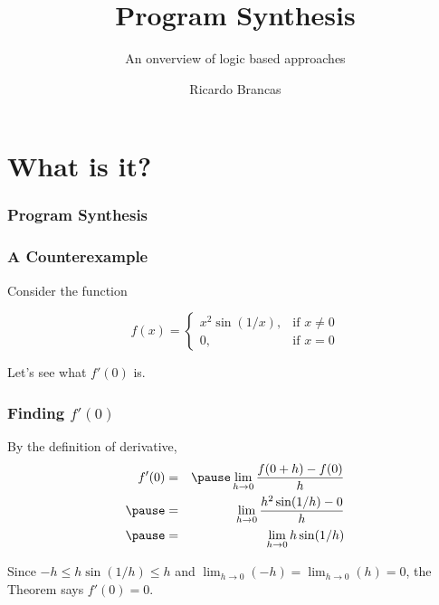 \documentclass{beamer}
\title{Program Synthesis}
\subtitle{An onverview of logic based approaches}
\author{Ricardo Brancas}
\institute{Instituto Superior Técnico}
\theoremstyle{definition} %
\begin{document}
\begin{frame}
    \titlepage
\end{frame}

\section{What is it?}

\begin{frame}
    \frametitle{Program Synthesis}

    \centering

\end{frame}

\begin{frame}
    \frametitle{A Counterexample}

    Consider the function

    $$ f(x)=
    \begin{cases} %
    x^2\sin(1/x), &\text{if }x\neq0 \\
    0, &\text{if }x=0
    \end{cases}
    $$

    Let's see what $f'(0)$ is.
\end{frame}

\begin{frame}
    \frametitle{Finding $f'(0)$}

    By the definition of derivative,
    \begin{eqnarray*} %
    f'(0)&=&\pause\displaystyle\lim_{h\to 0}\frac{f(0+h)-f(0)}{h}\\
    \pause&=&\displaystyle\lim_{h\to 0}\frac{h^2\sin(1/h)-0}{h}\\
    \pause&=&\displaystyle\lim_{h\to 0}h\sin(1/h)\\
    \end{eqnarray*}

    Since $-h\leq h\sin(1/h)\leq h$ \pause and $\displaystyle\lim_{h\to 0}(-h)=\displaystyle\lim_{h\to 0}(h)=0$, \pause the Theorem says \pause $f'(0)=0.$
\end{frame}
\end{document}

